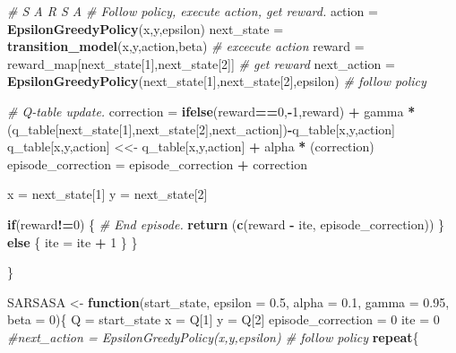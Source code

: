 \documentclass[
]{article}
\newenvironment{Shaded}{\begin{snugshade}}{\end{snugshade}}
\newcommand{\AttributeTok}[1]{\textcolor[rgb]{0.13,0.29,0.53}{#1}}
\newcommand{\CommentTok}[1]{\textcolor[rgb]{0.56,0.35,0.01}{\textit{#1}}}
\newcommand{\ControlFlowTok}[1]{\textcolor[rgb]{0.13,0.29,0.53}{\textbf{#1}}}
\newcommand{\DecValTok}[1]{\textcolor[rgb]{0.00,0.00,0.81}{#1}}
\newcommand{\FloatTok}[1]{\textcolor[rgb]{0.00,0.00,0.81}{#1}}
\newcommand{\FunctionTok}[1]{\textcolor[rgb]{0.13,0.29,0.53}{\textbf{#1}}}
\newcommand{\NormalTok}[1]{#1}
\newcommand{\OtherTok}[1]{\textcolor[rgb]{0.56,0.35,0.01}{#1}}
\newcommand{\SpecialCharTok}[1]{\textcolor[rgb]{0.81,0.36,0.00}{\textbf{#1}}}
\begin{document}
\begin{Shaded}
\begin{Highlighting}[]
    \CommentTok{\# S A R S A}
    \CommentTok{\# Follow policy, execute action, get reward.}
\NormalTok{    action }\OtherTok{=} \FunctionTok{EpsilonGreedyPolicy}\NormalTok{(x,y,epsilon)}
\NormalTok{    next\_state }\OtherTok{=} \FunctionTok{transition\_model}\NormalTok{(x,y,action,beta) }\CommentTok{\# excecute action}
\NormalTok{    reward }\OtherTok{=}\NormalTok{ reward\_map[next\_state[}\DecValTok{1}\NormalTok{],next\_state[}\DecValTok{2}\NormalTok{]] }\CommentTok{\# get reward}
\NormalTok{    next\_action }\OtherTok{=} \FunctionTok{EpsilonGreedyPolicy}\NormalTok{(next\_state[}\DecValTok{1}\NormalTok{],next\_state[}\DecValTok{2}\NormalTok{],epsilon) }\CommentTok{\# follow policy}

    \CommentTok{\# Q{-}table update.}
\NormalTok{    correction }\OtherTok{=} \FunctionTok{ifelse}\NormalTok{(reward}\SpecialCharTok{==}\DecValTok{0}\NormalTok{,}\SpecialCharTok{{-}}\DecValTok{1}\NormalTok{,reward) }\SpecialCharTok{+}\NormalTok{ gamma }\SpecialCharTok{*}\NormalTok{ (q\_table[next\_state[}\DecValTok{1}\NormalTok{],next\_state[}\DecValTok{2}\NormalTok{],next\_action])}\SpecialCharTok{{-}}\NormalTok{q\_table[x,y,action]}
\NormalTok{    q\_table[x,y,action] }\OtherTok{\textless{}\textless{}{-}}\NormalTok{ q\_table[x,y,action] }\SpecialCharTok{+}\NormalTok{ alpha }\SpecialCharTok{*}\NormalTok{ (correction)}
\NormalTok{    episode\_correction }\OtherTok{=}\NormalTok{ episode\_correction }\SpecialCharTok{+}\NormalTok{ correction}

\NormalTok{    x }\OtherTok{=}\NormalTok{ next\_state[}\DecValTok{1}\NormalTok{]}
\NormalTok{    y }\OtherTok{=}\NormalTok{ next\_state[}\DecValTok{2}\NormalTok{]}

    \ControlFlowTok{if}\NormalTok{(reward}\SpecialCharTok{!=}\DecValTok{0}\NormalTok{) \{}
      \CommentTok{\# End episode.}
      \FunctionTok{return}\NormalTok{ (}\FunctionTok{c}\NormalTok{(reward }\SpecialCharTok{{-}}\NormalTok{ ite, episode\_correction))}
\NormalTok{    \}}
    \ControlFlowTok{else}\NormalTok{ \{}
\NormalTok{      ite }\OtherTok{=}\NormalTok{ ite }\SpecialCharTok{+} \DecValTok{1}
\NormalTok{    \}}
\NormalTok{  \}}

\NormalTok{\}}



\NormalTok{SARSASA }\OtherTok{\textless{}{-}} \ControlFlowTok{function}\NormalTok{(start\_state, }\AttributeTok{epsilon =} \FloatTok{0.5}\NormalTok{, }\AttributeTok{alpha =} \FloatTok{0.1}\NormalTok{, }\AttributeTok{gamma =} \FloatTok{0.95}\NormalTok{, }\AttributeTok{beta =} \DecValTok{0}\NormalTok{)\{}
\NormalTok{  Q }\OtherTok{=}\NormalTok{ start\_state}
\NormalTok{  x }\OtherTok{=}\NormalTok{ Q[}\DecValTok{1}\NormalTok{]}
\NormalTok{  y }\OtherTok{=}\NormalTok{ Q[}\DecValTok{2}\NormalTok{]}
\NormalTok{  episode\_correction }\OtherTok{=} \DecValTok{0}
\NormalTok{  ite }\OtherTok{=} \DecValTok{0}
  \CommentTok{\#next\_action = EpsilonGreedyPolicy(x,y,epsilon) \# follow policy}
  \ControlFlowTok{repeat}\NormalTok{\{}


\end{Highlighting}
\end{Shaded}
\end{document}
